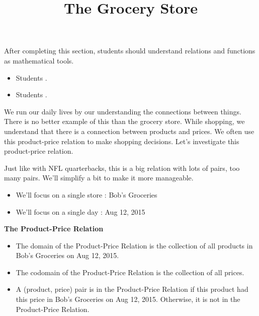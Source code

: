 \documentclass{ximera}
\title{The Grocery Store}
\begin{document}
\begin{abstract}
\end{abstract}

\maketitle

\begin{sectionOutcomes}

After completing this section, students should understand relations and functions as mathematical tools. 

\begin{itemize}
\item Students .
\item Students .
\end{itemize}

\end{sectionOutcomes}





We run our daily lives by our understanding the connections between things.  There is no better example of this than the grocery store.  While shopping, we understand that there is a connection between products and prices. We often use this product-price relation to make shopping decisions.  Let's investigate this product-price relation.

Just like with NFL quarterbacks, this is a big relation with lots of pairs, too many pairs.  We'll simplify a bit to make it more manageable. 

\begin{itemize}
\item We'll focus on a single store : Bob's Groceries
\item We'll focus on a single day : Aug 12, 2015
\end{itemize}


\begin{definition}
\textbf{The Product-Price Relation}
\begin{itemize}
\item The domain of the Product-Price Relation is the collection of all products in Bob's Groceries on Aug 12, 2015. 
\item The codomain of the Product-Price Relation is the collection of all prices. 
\item A (product, price) pair is in the Product-Price Relation if this product had this price in Bob's Groceries on Aug 12, 2015. Otherwise, it is not in the Product-Price Relation.
\end{itemize}
\end{definition}
\end{document}
